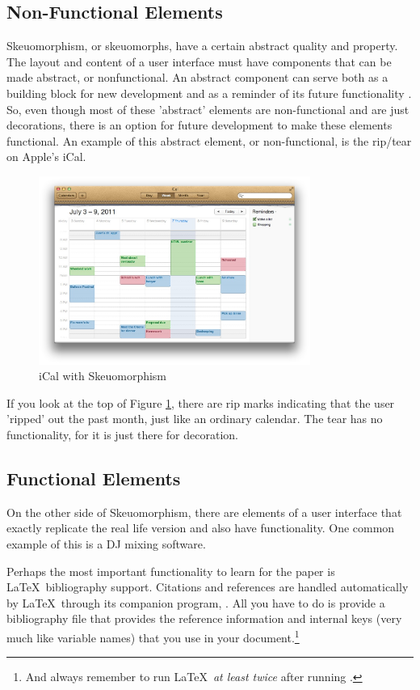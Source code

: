 \documentclass{article}
\begin{document}
\subsection{Non-Functional Elements}

Skeuomorphism, or skeuomorphs, have a certain abstract quality and property.  The layout and content of a user interface must have components that can be made abstract, or nonfunctional.  An abstract component can serve both as a building block for new development and as a reminder of its future functionality \cite{skeu-software}. So, even though most of these 'abstract' elements are non-functional and are just decorations, there is an option for future development to make these elements functional.  An example of this abstract element, or non-functional, is the rip/tear on Apple's iCal.

\begin{figure}[H]
\centering
\includegraphics[width=3.5in]{ical.jpeg} 

\caption{iCal with Skeuomorphism}
\label{iCal}
\end{figure}

If you look at the top of Figure \ref{iCal}, there are rip marks indicating that the user 'ripped' out the past month, just like an ordinary calendar.  The tear has no functionality, for it is just there for decoration.

\subsection{Functional Elements}

On the other side of Skeuomorphism, there are elements of a user interface that exactly replicate the real life version and also have functionality.  One common example of this is a DJ mixing software.

Perhaps the most important functionality to learn for the paper is \LaTeX\ bibliography support.  Citations and references are handled automatically by \LaTeX\ through its companion program, \BibTeX.  All you have to do is provide a bibliography file that provides the reference information and internal keys (very much like variable names) that you use in your document.\footnote{And always remember to run \LaTeX\ \emph{at least twice} after running \BibTeX.}
\end{document}
